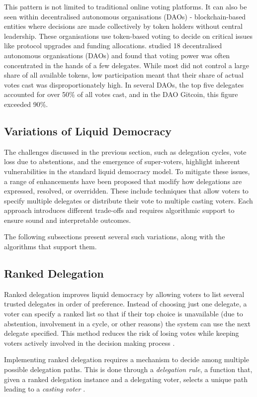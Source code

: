 This pattern is not limited to traditional online voting platforms. It can also be seen within decentralised autonomous organisations (DAOs) - blockchain-based entities where decisions are made collectively by token holders without central leadership. These organisations use token-based voting to decide on critical issues like protocol upgrades and funding allocations. \cite{hallWhatHappensWhen2024} studied 18 decentralised autonomous organisations (DAOs) and found that voting power was often concentrated in the hands of a few delegates. While most did not control a large share of all available tokens, low participation meant that their share of actual votes cast was disproportionately high. In several DAOs, the top five delegates accounted for over 50\% of all votes cast, and in the DAO Gitcoin, this figure exceeded 90\%.

\subsection{Variations of Liquid Democracy}
The challenges discussed in the previous section, such as delegation cycles, vote loss due to abstentions, and the emergence of super-voters, highlight inherent vulnerabilities in the standard liquid democracy model. To mitigate these issues, a range of enhancements have been proposed that modify how delegations are expressed, resolved, or overridden. These include techniques that allow voters to specify multiple delegates or distribute their vote to multiple casting voters. Each approach introduces different trade-offs and requires algorithmic support to ensure sound and interpretable outcomes.

The following subsections present several such variations, along with the algorithms that support them.
\subsection*{Ranked Delegation} Ranked delegation improves liquid democracy by allowing voters to list several trusted delegates in order of preference. Instead of choosing just one delegate, a voter can specify a ranked list so that if their top choice is unavailable (due to abstention, involvement in a cycle, or other reasons) the system can use the next delegate specified. This method reduces the risk of losing votes while keeping voters actively involved in the decision making process \citep{brill_liquid_2022}.

Implementing ranked delegation requires a mechanism to decide among multiple possible delegation paths. This is done through a \textit{delegation rule}, a function that, given a ranked delegation instance and a delegating voter, selects a unique path leading to a \textit{casting voter} \citep{brill_liquid_2022}.

